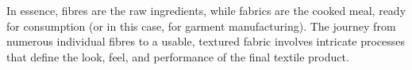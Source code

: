 In essence, fibres are the raw ingredients, while fabrics are the cooked meal, ready for consumption (or in this case, for garment manufacturing). The journey from numerous individual fibres to a usable, textured fabric involves intricate processes that define the look, feel, and performance of the final textile product.